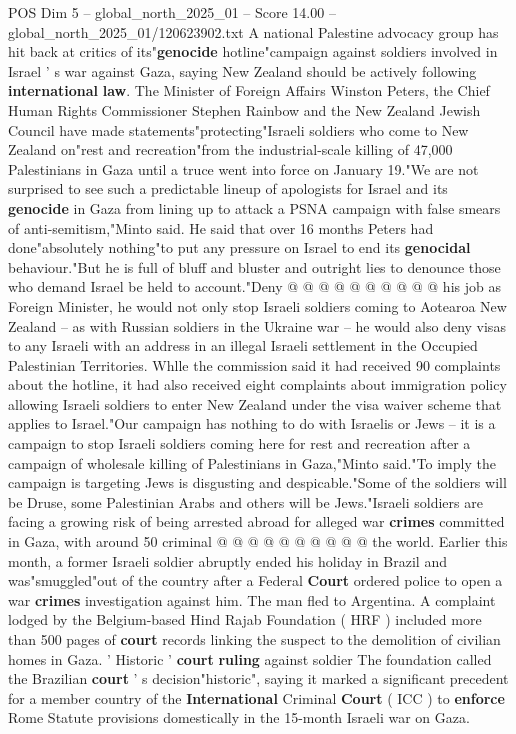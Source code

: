 \begin{textsample}{POS Dim 5 – global\_north\_2025\_01 – Score 14.00 – global\_north\_2025\_01/120623902.txt}  \label{ex:f5_pos_384}
A national Palestine advocacy group has hit back at critics of its"\textbf{genocide} hotline"campaign against soldiers involved in Israel ' s war against Gaza, saying New Zealand should be actively following \textbf{international} \textbf{law}.
The Minister of Foreign Affairs Winston Peters, the Chief Human Rights Commissioner Stephen Rainbow and the New Zealand Jewish Council have made statements"protecting"Israeli soldiers who come to New Zealand on"rest and recreation"from the industrial-scale killing of 47,000 Palestinians in Gaza until a truce went into force on January 19."We are not surprised to see such a predictable lineup of apologists for Israel and its \textbf{genocide} in Gaza from lining up to attack a PSNA campaign with false smears of anti-semitism,"Minto said.
He said that over 16 months Peters had done"absolutely nothing"to put any pressure on Israel to end its \textbf{genocidal} behaviour."But he is full of bluff and bluster and outright lies to denounce those who demand Israel be held to account."Deny @ @ @ @ @ @ @ @ @ @ his job as Foreign Minister, he would not only stop Israeli soldiers coming to Aotearoa New Zealand -- as with Russian soldiers in the Ukraine war -- he would also deny visas to any Israeli with an address in an illegal Israeli settlement in the Occupied Palestinian Territories.
Whlle the commission said it had received 90 complaints about the hotline, it had also received eight complaints about immigration policy allowing Israeli soldiers to enter New Zealand under the visa waiver scheme that applies to Israel."Our campaign has nothing to do with Israelis or Jews -- it is a campaign to stop Israeli soldiers coming here for rest and recreation after a campaign of wholesale killing of Palestinians in Gaza,"Minto said."To imply the campaign is targeting Jews is disgusting and despicable."Some of the soldiers will be Druse, some Palestinian Arabs and others will be Jews."Israeli soldiers are facing a growing risk of being arrested abroad for alleged war \textbf{crimes} committed in Gaza, with around 50 criminal @ @ @ @ @ @ @ @ @ @ the world.
Earlier this month, a former Israeli soldier abruptly ended his holiday in Brazil and was"smuggled"out of the country after a Federal \textbf{Court} ordered police to open a war \textbf{crimes} investigation against him.
The man fled to Argentina.
A complaint lodged by the Belgium-based Hind Rajab Foundation ( HRF ) included more than 500 pages of \textbf{court} records linking the suspect to the demolition of civilian homes in Gaza. ' Historic ' \textbf{court} \textbf{ruling} against soldier The foundation called the Brazilian \textbf{court} ' s decision"historic", saying it marked a significant precedent for a member country of the \textbf{International} Criminal \textbf{Court} ( ICC ) to \textbf{enforce} Rome Statute provisions domestically in the 15-month Israeli war on Gaza.

\end{textsample}
